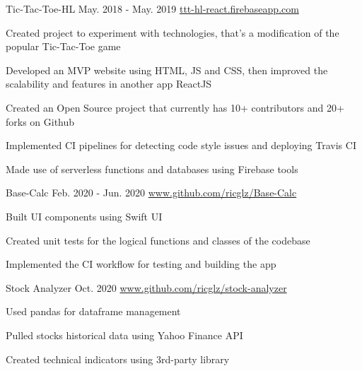 \begin{cventries}

  \cventry
    {}
    {Tic-Tac-Toe-HL} %
    {May. 2018 - May. 2019} %
    {\url{ttt-hl-react.firebaseapp.com}} %
    {
      \begin{cvitems} %
        \item {Created project to experiment with technologies, that's a modification of the popular Tic-Tac-Toe game}
        \item {Developed an MVP website using HTML, JS and CSS, then improved the scalability and features in another app ReactJS}
        \item {Created an Open Source project that currently has 10+ contributors and 20+ forks on Github}
        \item {Implemented CI pipelines for detecting code style issues and deploying Travis CI}
        \item {Made use of serverless functions and databases using Firebase tools}
      \end{cvitems}
    }

  \cventry
    {}
    {Base-Calc} %
    {Feb. 2020 - Jun. 2020} %
    {\url{www.github.com/ricglz/Base-Calc}} %
    {
      \begin{cvitems} %
        \item {Built UI components using Swift UI}
        \item {Created unit tests for the logical functions and classes of the codebase}
        \item {Implemented the CI workflow for testing and building the app}
      \end{cvitems}
    }

  \cventry
    {}
    {Stock Analyzer} %
    {Oct. 2020} %
    {\url{www.github.com/ricglz/stock-analyzer}} %
    {
      \begin{cvitems} %
        \item {Used pandas for dataframe management}
        \item {Pulled stocks historical data using Yahoo Finance API}
        \item {Created technical indicators using 3rd-party library}
      \end{cvitems}
    }


\end{cventries}

